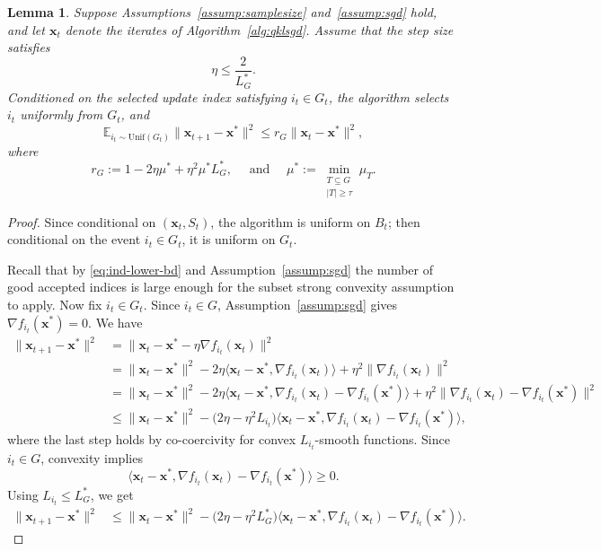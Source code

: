 \documentclass[11pt]{article}
\newcommand{\ve}[1]{\mathbf{#1}}
\newtheorem{lem}{Lemma}
\begin{document}
\begin{lem}\label{lem:noncorruptProjection-sgd}
Suppose {Assumptions~\ref{assump:samplesize} and~\ref{assump:sgd}} hold, and let $\ve{x}_t$ denote the iterates
of Algorithm~\ref{alg:qklsgd}. Assume that the step size satisfies
\[
\eta \le \frac{2}{L_{G}^*}.
\]
Conditioned on the selected update index satisfying $i_t\in G_t$, the algorithm
selects $i_t$ uniformly from $G_t$, and
\[
\mathbb{E}_{i_t\sim \mathrm{Unif}(G_t)}
\|\ve{x}_{t+1}-\ve{x}^*\|^2
\le
r_G \|\ve{x}_t-\ve{x}^*\|^2,
\]
where
\[
r_G := 1-2\eta\mu^*+\eta^2\mu^*L_{G}^*,
\quad \text{ and } \quad
\mu^*
:=
\min_{\substack{T\subseteq G\\ |T|\ge \tau}}\mu_T.
\]
\end{lem}

\begin{proof}
Since conditional on $(\ve{x}_t,S_t)$, the algorithm is uniform on $B_t$; then conditional on the event $i_t\in G_t$, it is uniform on $G_t$.

Recall that by \eqref{eq:ind-lower-bd} and Assumption~\ref{assump:sgd} the number of good accepted indices is large enough for the subset strong convexity
assumption to apply. Now fix $i_t\in G_t$. Since $i_t\in G$, Assumption~\ref{assump:sgd} gives
$\nabla f_{i_t}(\ve{x}^*)=0.$
We have
\begin{align*}
\|\ve{x}_{t+1}-\ve{x}^*\|^2
&=
\|\ve{x}_t-\ve{x}^*-\eta\nabla f_{i_t}(\ve{x}_t)\|^2 \\
&=
\|\ve{x}_t-\ve{x}^*\|^2
-2\eta
\langle \ve{x}_t-\ve{x}^*,\nabla f_{i_t}(\ve{x}_t)\rangle
+\eta^2\|\nabla f_{i_t}(\ve{x}_t)\|^2 \\
&=
\|\ve{x}_t-\ve{x}^*\|^2
-2\eta
\langle
\ve{x}_t-\ve{x}^*,
\nabla f_{i_t}(\ve{x}_t)-\nabla f_{i_t}(\ve{x}^*)
\rangle
+\eta^2
\|\nabla f_{i_t}(\ve{x}_t)-\nabla f_{i_t}(\ve{x}^*)\|^2 \\
&\le \|\ve{x}_t-\ve{x}^*\|^2
-
\bigl(2\eta-\eta^2L_{i_t}\bigr)
\bigl\langle
\ve{x}_t-\ve{x}^*,
\nabla f_{i_t}(\ve{x}_t)-\nabla f_{i_t}(\ve{x}^*)
\bigr\rangle,
\end{align*}
where the last step holds by co-coercivity for convex $L_{i_t}$-smooth functions.
Since $i_t\in G$, convexity implies
\[
\bigl\langle
\ve{x}_t-\ve{x}^*,
\nabla f_{i_t}(\ve{x}_t)-\nabla f_{i_t}(\ve{x}^*)
\bigr\rangle
\ge 0.
\]
Using $L_{i_t}\le L_{G}^*$, we get
\begin{align*}
\|\ve{x}_{t+1}-\ve{x}^*\|^2
&\le
\|\ve{x}_t-\ve{x}^*\|^2 -
\bigl(2\eta-\eta^2L_{G}^*\bigr)
\bigl\langle
\ve{x}_t-\ve{x}^*,
\nabla f_{i_t}(\ve{x}_t)-\nabla f_{i_t}(\ve{x}^*)
\bigr\rangle.
\end{align*}


\end{proof}
\end{document}
